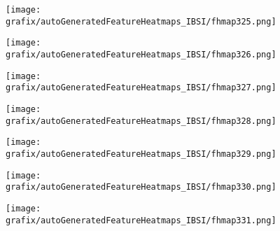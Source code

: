 \hspace{\hsp} 
\begin{subfigure}{\wid\textwidth} 
    \centering 
    \caption{\tiny \sffamily {}} 
    \vspace{\vsp} 
    \texttt{[image: grafix/autoGeneratedFeatureHeatmaps\_IBSI/fhmap325.png]} 
\end{subfigure} 
\hspace{\hsp} 
\begin{subfigure}{\wid\textwidth} 
    \centering 
    \caption{\tiny \sffamily {}} 
    \vspace{\vsp} 
    \texttt{[image: grafix/autoGeneratedFeatureHeatmaps\_IBSI/fhmap326.png]} 
\end{subfigure} 
\hspace{\hsp} 
\begin{subfigure}{\wid\textwidth} 
    \centering 
    \caption{\tiny \sffamily {}} 
    \vspace{\vsp} 
    \texttt{[image: grafix/autoGeneratedFeatureHeatmaps\_IBSI/fhmap327.png]} 
\end{subfigure} 
\hspace{\hsp} 
\begin{subfigure}{\wid\textwidth} 
    \centering 
    \caption{\tiny \sffamily {}} 
    \vspace{\vsp} 
    \texttt{[image: grafix/autoGeneratedFeatureHeatmaps\_IBSI/fhmap328.png]} 
\end{subfigure} 
\hspace{\hsp} 
\begin{subfigure}{\wid\textwidth} 
    \centering 
    \caption{\tiny \sffamily {}} 
    \vspace{\vsp} 
    \texttt{[image: grafix/autoGeneratedFeatureHeatmaps\_IBSI/fhmap329.png]} 
\end{subfigure} 
\hspace{\hsp} 
\begin{subfigure}{\wid\textwidth} 
    \centering 
    \caption{\tiny \sffamily {}} 
    \vspace{\vsp} 
    \texttt{[image: grafix/autoGeneratedFeatureHeatmaps\_IBSI/fhmap330.png]} 
\end{subfigure} 
\hspace{\hsp} 
\begin{subfigure}{\wid\textwidth} 
    \centering 
    \caption{\tiny \sffamily {}} 
    \vspace{\vsp} 
    \texttt{[image: grafix/autoGeneratedFeatureHeatmaps\_IBSI/fhmap331.png]} 
\end{subfigure} 
